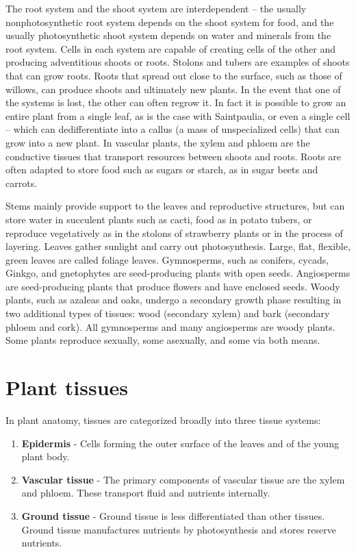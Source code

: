 \documentclass[]{book}
\providecommand{\tightlist}{%
  \setlength{\itemsep}{0pt}\setlength{\parskip}{0pt}}
\begin{document}
The root system and the shoot system are interdependent -- the usually nonphotosynthetic root system depends on the shoot system for food, and the usually photosynthetic shoot system depends on water and minerals from the root system. Cells in each system are capable of creating cells of the other and producing adventitious shoots or roots. Stolons and tubers are examples of shoots that can grow roots. Roots that spread out close to the surface, such as those of willows, can produce shoots and ultimately new plants. In the event that one of the systems is lost, the other can often regrow it. In fact it is possible to grow an entire plant from a single leaf, as is the case with Saintpaulia, or even a single cell -- which can dedifferentiate into a callus (a mass of unspecialized cells) that can grow into a new plant. In vascular plants, the xylem and phloem are the conductive tissues that transport resources between shoots and roots. Roots are often adapted to store food such as sugars or starch, as in sugar beets and carrots.

Stems mainly provide support to the leaves and reproductive structures, but can store water in succulent plants such as cacti, food as in potato tubers, or reproduce vegetatively as in the stolons of strawberry plants or in the process of layering. Leaves gather sunlight and carry out photosynthesis. Large, flat, flexible, green leaves are called foliage leaves. Gymnosperms, such as conifers, cycads, Ginkgo, and gnetophytes are seed-producing plants with open seeds. Angiosperms are seed-producing plants that produce flowers and have enclosed seeds. Woody plants, such as azaleas and oaks, undergo a secondary growth phase resulting in two additional types of tissues: wood (secondary xylem) and bark (secondary phloem and cork). All gymnosperms and many angiosperms are woody plants. Some plants reproduce sexually, some asexually, and some via both means.

\hypertarget{plant-tissues}{%
\section{Plant tissues}\label{plant-tissues}}

In plant anatomy, tissues are categorized broadly into three tissue systems:

\begin{enumerate}
\def\labelenumi{\arabic{enumi}.}
\tightlist
\item
  \textbf{Epidermis} - Cells forming the outer surface of the leaves and of the young plant body.
\item
  \textbf{Vascular tissue} - The primary components of vascular tissue are the xylem and phloem. These transport fluid and nutrients internally.
\item
  \textbf{Ground tissue} - Ground tissue is less differentiated than other tissues. Ground tissue manufactures nutrients by photosynthesis and stores reserve nutrients.
\end{enumerate}
\end{document}
